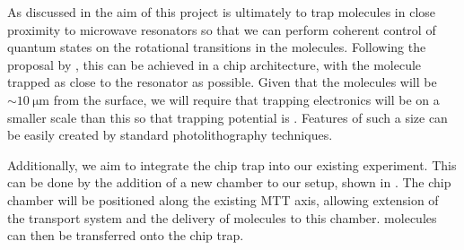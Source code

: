 As discussed in  the aim of this project is ultimately to
trap molecules in close proximity to microwave resonators so that we can
perform coherent control of quantum states on the rotational transitions in the
molecules.
%
Following the proposal by , this can be achieved in a chip
architecture, with the molecule trapped as close to the resonator as possible.
%
%
Given that the molecules will be $\sim\SI{10}{\micro\meter}$ from the surface,
we will require that trapping electronics will be on a smaller scale than this
so that trapping potential is .  Features of such a
size can be easily created by standard photolithography techniques.

Additionally, we aim to integrate the chip trap into our existing \CaF{}
experiment. This can be done by the addition of a new chamber to our setup,
shown in . The chip chamber will be
positioned along the existing MTT axis, allowing extension of the transport
system and the delivery of molecules to this chamber. \CaF{} molecules can then
be transferred onto the chip trap.

